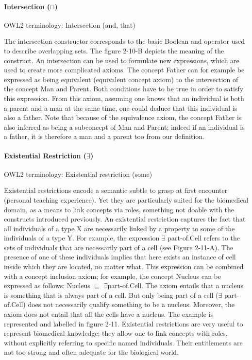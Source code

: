 \paragraph{\textbf{Intersection ($ \sqcap $)}\\}
\label{intersection}
OWL2 terminology: Intersection (and, that)

The intersection constructor corresponds to the basic Boolean and operator used to describe overlapping sets. The figure 2-10-B depicts the meaning of the construct. An intersection can be used to formulate new expressions, which are used to create more complicated axioms. The concept Father can for example be expressed as being equivalent (equivalent concept axiom) to the intersection of the concept Man and Parent. Both conditions have to be true in order to satisfy this expression. From this axiom, assuming one knows that an individual is both a parent and a man at the same time, one could deduce that this individual is also a father. Note that because of the equivalence axiom, the concept Father is also inferred as being a subconcept of Man and Parent; indeed if an individual is a father, it is therefore a man and a parent too from our definition.

\paragraph{\textbf{Existential Restriction  ($ \exists $)}\\}
\label{exists}
OWL2 terminology: Existential restriction (some)

Existential restrictions encode a semantic subtle to grasp at first encounter (personal teaching experience). Yet they are particularly suited for the biomedical domain, as a means to link concepts via roles, something not doable with the constructs introduced previously. An existential restriction captures the fact that all individuals of a type X are necessarily linked by a property to some of the individuals of a type Y. For example, the expression $ \exists $ part-of.Cell refers to the sets of individuals that are necessarily part of a cell (see Figure 2-11-A). The presence of one of these individuals implies that here exists an instance of cell inside which they are located, no matter what. This expression can be combined with a concept inclusion axiom; for example, the concept Nucleus can be expressed as follows: Nucleus $ \sqsubseteq $ $ \exists $part-of.Cell. The axiom entails that a nucleus is something that is always part of a cell. But only being part of a cell ($ \exists $ part-of.Cell) does not necessarily qualify something to be a nucleus. Moreover, the axiom does not entail that all the cells have a nucleus. The example is represented and labelled in figure 2-11. Existential restrictions are very useful to represent biomedical knowledge; they allow one to link concepts with roles, without explicitly referring to specific named individuals. Their entitlements are not too strong and often adequate for the biological world.

